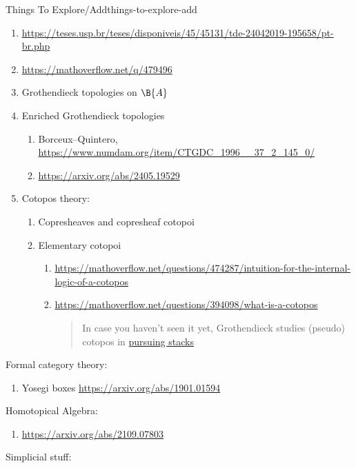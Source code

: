 \begin{remark}{Things To Explore/Add}{things-to-explore-add}
\begin{enumerate}
        \item \url{https://teses.usp.br/teses/disponiveis/45/45131/tde-24042019-195658/pt-br.php}
        \item \url{https://mathoverflow.net/q/479496}
        \item Grothendieck topologies on $\B{A}$
        \item Enriched Grothendieck topologies
            \begin{enumerate}
                \item Borceux--Quintero, \url{https://www.numdam.org/item/CTGDC_1996__37_2_145_0/}
                \item \url{https://arxiv.org/abs/2405.19529}
            \end{enumerate}
        \item Cotopos theory:
            \begin{enumerate}
                \item Copresheaves and copresheaf cotopoi
                \item Elementary cotopoi
                    \begin{enumerate}
                        \item \url{https://mathoverflow.net/questions/474287/intuition-for-the-internal-logic-of-a-cotopos}
                        \item \url{https://mathoverflow.net/questions/394098/what-is-a-cotopos}
                            \begin{quote}
                                In case you haven’t seen it yet, Grothendieck studies (pseudo) cotopos in \href{n case you haven’t seen it yet, Grothendieck studies (pseudo) cotopos in pursuing stacks}{pursuing stacks}
                            \end{quote}
                    \end{enumerate}
            \end{enumerate}
    \end{enumerate}
    Formal category theory:
    \begin{enumerate}
        \item Yosegi boxes \url{https://arxiv.org/abs/1901.01594}
    \end{enumerate}
    Homotopical Algebra:
    \begin{enumerate}
        \item \url{https://arxiv.org/abs/2109.07803}
    \end{enumerate}
    Simplicial stuff:
    \begin{enumerate}

\end{enumerate}
\end{remark}
